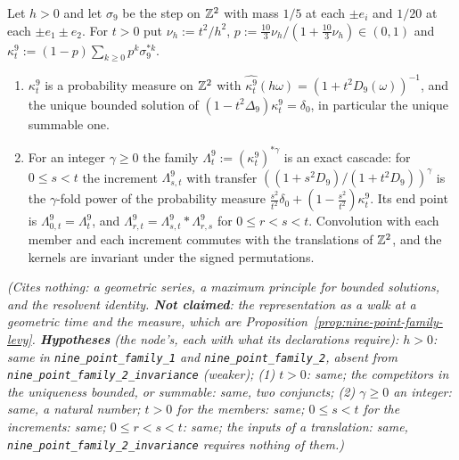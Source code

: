 \begin{proposition}
\label{prop:nine-point-family}
\leanok
{}
Let $h > 0$ and let $\sigma_9$ be the step on $\mathbb{Z}^2$ with mass $1/5$ at each $\pm e_i$ and $1/20$ at
each $\pm e_1 \pm e_2$. For $t > 0$ put $\nu_h := t^2/h^2$,
$p := \tfrac{10}{3}\nu_h/(1 + \tfrac{10}{3}\nu_h) \in (0,1)$ and
$\kappa^9_t := (1-p)\sum_{k \ge 0}p^k\sigma_9^{*k}$.
\begin{enumerate}
\item $\kappa^9_t$ is a probability measure on $\mathbb{Z}^2$ with
$\widehat{\kappa^9_t}(h\omega) = (1 + t^2D_9(\omega))^{-1}$, and the unique bounded solution of
$(1 - t^2\Delta_9)\kappa^9_t = \delta_0$, in particular the unique summable one.
\item For an integer $\gamma \ge 0$ the family $\Lambda^9_t := (\kappa^9_t)^{*\gamma}$ is an exact
cascade: for $0 \le s < t$ the increment $\Lambda^9_{s,t}$ with transfer
$((1 + s^2D_9)/(1 + t^2D_9))^\gamma$ is the $\gamma$-fold power of the probability measure
$\tfrac{s^2}{t^2}\delta_0 + (1 - \tfrac{s^2}{t^2})\kappa^9_t$. Its end point is
$\Lambda^9_{0,t} = \Lambda^9_t$, and $\Lambda^9_{r,t} = \Lambda^9_{s,t} * \Lambda^9_{r,s}$ for
$0 \le r < s < t$. Convolution with each member
and each increment commutes with the translations of $\mathbb{Z}^2$, and the kernels are invariant under
the signed permutations.
\end{enumerate}
\statusT\quad\emph{(Cites nothing: a geometric series, a maximum principle for bounded solutions,
and the resolvent identity. \textbf{Not claimed}: the representation as a walk at a geometric time
and the \Levy{} measure, which are Proposition~\ref{prop:nine-point-family-levy}.
\textbf{Hypotheses} (the node's, each with what its declarations require): $h > 0$: same in
\texttt{nine\_point\_family\_1} and \texttt{nine\_point\_family\_2}, absent from
\texttt{nine\_point\_family\_2\_invariance} (weaker); (1) $t > 0$: same; the competitors in the
uniqueness bounded, or summable: same, two conjuncts; (2) $\gamma \ge 0$ an integer: same, a
natural number; $t > 0$ for the members: same; $0 \le s < t$ for the increments: same;
$0 \le r < s < t$: same; the inputs of a translation: same, \texttt{nine\_point\_family\_2\_invariance}
requires nothing of them.)}
\end{proposition}

